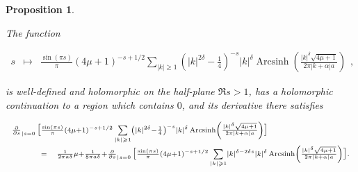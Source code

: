 \documentclass{jams-l}
\newtheorem{proposition}[theorem]{Proposition}
\theoremstyle{definition}
\theoremstyle{remark}
\numberwithin{equation}{section}
\DeclareMathOperator{\arcsinh}{Arcsinh}
\begin{document}
            \begin{proposition}
            \label{PropA4}
            
                The function
                
                \[ \begin{array}{lll}
                        s & \longmapsto & \frac{\sin \left(\pi s \right)}{\pi} \left( 4 \mu + 1 \right)^{-s+1/2} \sum\limits_{\left \vert k \right \vert \geqslant 1} \left( \left \vert k \right \vert^{2 \delta} - \frac{1}{4} \right)^{-s} \left \vert k \right \vert^{\delta} \arcsinh \left( \frac{\left \vert k \right \vert^{\delta} \sqrt{4 \mu + 1}}{2 \pi \left \vert k + \alpha \right \vert a} \right)
                    \end{array} , \]
                
                \noindent is well-defined and holomorphic on the half-plane $\Re s > 1$, has a holomorphic continuation to a region which contains $0$, and its derivative there satisfies
                
                \[ \begin{array}{lll}
                        \multicolumn{3}{l}{\scriptstyle \frac{\partial}{\partial s}_{\left \vert s = 0 \right.} \big[ \frac{\sin \left(\pi s \right)}{\pi} \left( 4 \mu + 1 \right)^{-s+1/2} \sum\limits_{\left \vert k \right \vert \geqslant 1} \left( \left \vert k \right \vert^{2 \delta} - \frac{1}{4} \right)^{-s} \left \vert k \right \vert^{\delta} \arcsinh \left( \frac{\left \vert k \right \vert^{\delta} \sqrt{4 \mu + 1}}{2 \pi \left \vert k + \alpha \right \vert a} \right) \big]} \\[1em]
                        
                        \qquad & \scriptstyle = & \scriptstyle \frac{1}{2 \pi a \delta} \mu + \frac{1}{8 \pi a \delta} + \frac{\partial}{\partial s}_{\left \vert s = 0 \right.} \big[ \frac{\sin \left(\pi s \right)}{\pi} \left( 4 \mu + 1 \right)^{-s+1/2} \sum\limits_{\left \vert k \right \vert \geqslant 1} \left \vert k \right \vert^{\delta - 2 \delta s} \left \vert k \right \vert^{\delta} \arcsinh \left( \frac{\left \vert k \right \vert^{\delta} \sqrt{4 \mu + 1}}{2 \pi \left \vert k + \alpha \right \vert a} \right) \big].
                    \end{array} \]
            
            \end{proposition}
            
\end{document}

